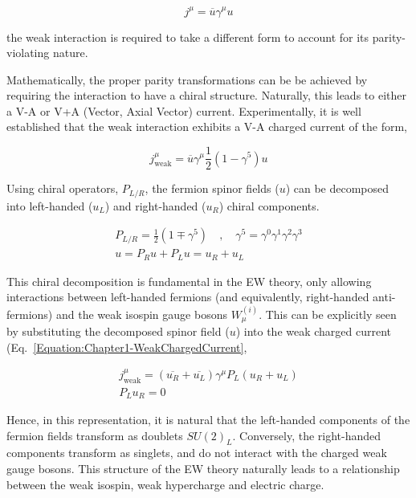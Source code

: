 \begin{equation}
    j^\mu = \overline{u}\gamma^\mu u
\end{equation}

the weak interaction is required to take a different form to account for its parity-violating nature.

Mathematically, the proper parity transformations can be be achieved by requiring the interaction to have a chiral structure. Naturally, this leads to either a V-A or V+A (Vector, Axial Vector) current. Experimentally, it is well established that the weak interaction exhibits a V-A charged current of the form,

\begin{equation}
    j^\mu_{\text{weak}} = \overline{u}\gamma^\mu \frac{1}{2}(1-\gamma^5)u
\label{Equation:Chapter1-WeakChargedCurrent}
\end{equation}

Using chiral operators, $P_{L/R}$, the fermion spinor fields ($u$) can be decomposed into left-handed ($u_{L}$) and right-handed ($u_{R}$) chiral components. 

\begin{equation}
\begin{array}{c}
    P_{L/R} = \frac{1}{2}(1\mp \gamma^5) \quad ,\quad \gamma^5 = \gamma^0\gamma^1\gamma^2\gamma^3 \\
    u = P_Ru +P_Lu = u_R + u_L
\end{array}
\end{equation}

This chiral decomposition is fundamental in the EW theory, only allowing interactions between left-handed fermions (and equivalently, right-handed anti-fermions) and the weak isospin gauge bosons $W_{\mu}^{(i)}$. This can be explicitly seen by substituting the decomposed spinor field ($u$) into the weak charged current (Eq.~\ref{Equation:Chapter1-WeakChargedCurrent},

\begin{equation}
\begin{array}{c}
    j^\mu_{\text{weak}} = (\overline{u_R} + \overline{u_L})\gamma^\mu P_L (u_R+u_L) \\
    P_L u_R = 0
\label{Equation:Chapter1-WeakChargedCurrent_Decomposed}
\end{array}
\end{equation}

Hence, in this representation, it is natural that the left-handed components of the fermion fields transform as doublets $SU(2)_L$. Conversely, the right-handed components transform as singlets, and do not interact with the charged weak gauge bosons. This structure of the EW theory naturally leads to a relationship between the weak isospin, weak hypercharge and electric charge.

